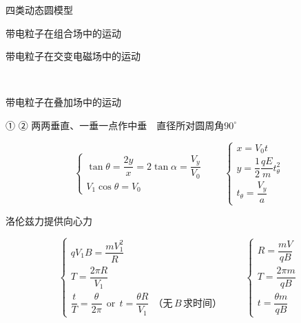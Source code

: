 四类动态圆模型

带电粒子在组合场中的运动


带电粒子在交变电磁场中的运动

\ 

带电粒子在叠加场中的运动

① ②
两两垂直、一垂一点作中垂\ \ 直径所对圆周角$90^\circ$




\[
\begin{cases}\tan\theta=\dfrac{2y}{x}=2\tan\alpha=\dfrac{V_y}{V_0}\\[6pt] V_1\cos\theta=V_0\end{cases}
\qquad
\begin{cases}x=V_0t\\[2pt] y=\dfrac{1}{2}\dfrac{qE}{m}t_{\theta}^{2}\\[4pt] t_{\theta}=\dfrac{V_y}{a}\end{cases}
\]

洛伦兹力提供向心力

\[
\begin{cases}qV_1B=\dfrac{mV_1^{2}}{R}\\[6pt] T=\dfrac{2\pi R}{V_1}\\[6pt] \dfrac{t}{T}=\dfrac{\theta}{2\pi}\ \ \text{or}\ \ t=\dfrac{\theta R}{V_1}\ \ \text{（无}\,B\,\text{求时间）}\end{cases}
\qquad
\begin{cases}R=\dfrac{mV}{qB}\\[6pt] T=\dfrac{2\pi m}{qB}\\[6pt] t=\dfrac{\theta m}{qB}\end{cases}
\]

